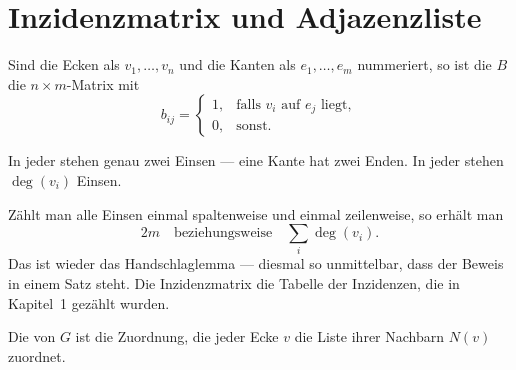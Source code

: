 \section{Inzidenzmatrix und Adjazenzliste}

\begin{definition}
Sind die Ecken als $v_1, \ldots, v_n$ und die Kanten als $e_1, \ldots, e_m$ nummeriert, so ist die  $B$ die $n \times m$-Matrix mit
\[ b_{ij} = \begin{cases} 1, & \text{falls } v_i \text{ auf } e_j \text{ liegt}, \\ 0, & \text{sonst.} \end{cases} \]
\end{definition}

\begin{merksatz}
In jeder  stehen genau zwei Einsen --- eine Kante hat zwei Enden. In jeder  stehen $\deg(v_i)$ Einsen.

Zählt man alle Einsen einmal spaltenweise und einmal zeilenweise, so erhält man
\[ 2m \quad \text{beziehungsweise} \quad \sum_i \deg(v_i) . \]
Das ist wieder das Handschlaglemma --- diesmal so unmittelbar, dass der Beweis in einem Satz steht. Die Inzidenzmatrix  die Tabelle der Inzidenzen, die in Kapitel~1 gezählt wurden.
\end{merksatz}

\begin{definition}
Die  von $G$ ist die Zuordnung, die jeder Ecke $v$ die Liste ihrer Nachbarn $N(v)$ zuordnet.
\end{definition}

